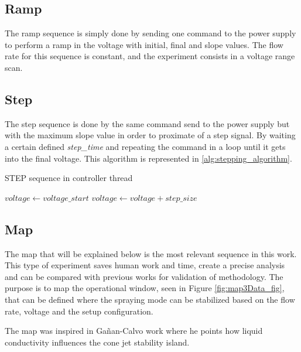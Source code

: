 \subsection{Ramp}

The ramp sequence is simply done by sending one command to the power supply to perform a ramp in the voltage with initial, final and slope values.
The flow rate for this sequence is constant, and the experiment consists in a voltage range scan.

\subsection{Step}
\label{subsec:step_routine}

The step sequence is done by the same command send to the power supply but with the maximum slope value in order to proximate of a step signal.
By waiting a certain defined \emph{step\_time} and repeating the command in a loop until it gets into the final voltage. This algorithm is represented in \ref{alg:stepping_algorithm}.


\begin{algorithm}
    \caption{STEP sequence in controller thread}\label{alg:stepping_algorithm}
    \begin{algorithmic}
        \State $voltage \gets voltage\_start$
         
            \State {}
            \State {}
            \State $voltage \gets voltage + step\_size$
        \EndWhile
    \EndProcedure

    \end{algorithmic}
\end{algorithm}

\subsection{Map}

The map that will be explained below is the most relevant sequence in this work. This type of experiment saves human work and time, create a precise analysis and can be compared with previous works for validation of methodology.
The purpose is to map the operational window, seen in Figure \ref{fig:map3Data_fig}, that can be defined where the spraying mode can be stabilized based on the flow rate, voltage and the setup configuration.

The map was inspired in Gañan-Calvo\cite{gananCalvo} work where he points how liquid conductivity influences the cone jet stability island. 

